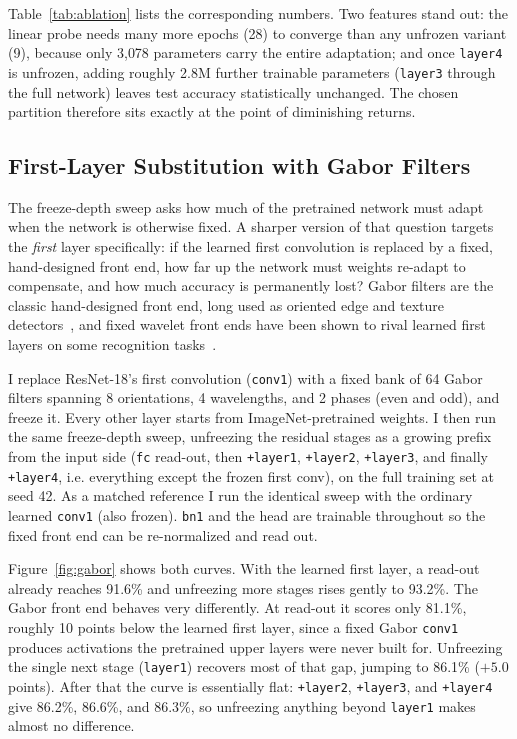 \documentclass[conference]{IEEEtran}
\begin{document}
Table~\ref{tab:ablation} lists the corresponding numbers. Two features stand out: the linear probe needs many more epochs (28) to converge than any unfrozen variant (9), because only 3{,}078 parameters carry the entire adaptation; and once \texttt{layer4} is unfrozen, adding roughly 2.8M further trainable parameters (\texttt{layer3} through the full network) leaves test accuracy statistically unchanged. The chosen partition therefore sits exactly at the point of diminishing returns.

\subsection{First-Layer Substitution with Gabor Filters}
\label{sec:gabor}
The freeze-depth sweep asks how much of the pretrained network must adapt when the network is otherwise fixed. A sharper version of that question targets the \emph{first} layer specifically: if the learned first convolution is replaced by a fixed, hand-designed front end, how far up the network must weights re-adapt to compensate, and how much accuracy is permanently lost? Gabor filters are the classic hand-designed front end, long used as oriented edge and texture detectors~\cite{jain1991unsupervised}, and fixed wavelet front ends have been shown to rival learned first layers on some recognition tasks~\cite{bruna2013scattering}.

I replace ResNet-18's first convolution (\texttt{conv1}) with a fixed bank of 64 Gabor filters spanning 8 orientations, 4 wavelengths, and 2 phases (even and odd), and freeze it. Every other layer starts from ImageNet-pretrained weights. I then run the same freeze-depth sweep, unfreezing the residual stages as a growing prefix from the input side (\texttt{fc} read-out, then \texttt{+layer1}, \texttt{+layer2}, \texttt{+layer3}, and finally \texttt{+layer4}, i.e. everything except the frozen first conv), on the full training set at seed 42. As a matched reference I run the identical sweep with the ordinary learned \texttt{conv1} (also frozen). \texttt{bn1} and the head are trainable throughout so the fixed front end can be re-normalized and read out.

Figure~\ref{fig:gabor} shows both curves. With the learned first layer, a read-out already reaches 91.6\% and unfreezing more stages rises gently to 93.2\%. The Gabor front end behaves very differently. At read-out it scores only 81.1\%, roughly 10 points below the learned first layer, since a fixed Gabor \texttt{conv1} produces activations the pretrained upper layers were never built for. Unfreezing the single next stage (\texttt{layer1}) recovers most of that gap, jumping to 86.1\% ($+5.0$ points). After that the curve is essentially flat: \texttt{+layer2}, \texttt{+layer3}, and \texttt{+layer4} give 86.2\%, 86.6\%, and 86.3\%, so unfreezing anything beyond \texttt{layer1} makes almost no difference.
\end{document}
